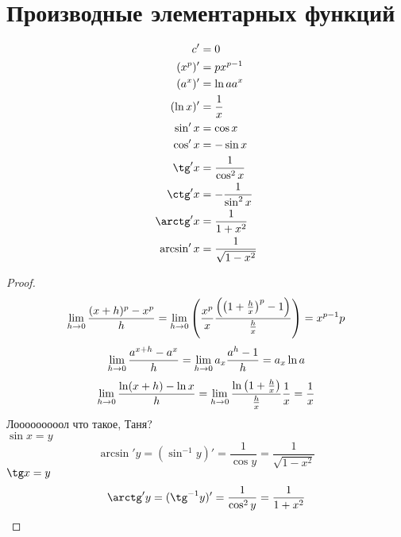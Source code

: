 \section{Производные элементарных функций}

\begin{align*}
c' &= 0 \\
(x^p)' &= px^{p-1} \\
(a^x)' &= \ln a a^x \\
(\ln x)' &= \frac1x \\
\sin' x &= \cos x \\
\cos' x &= -\sin x \\
\tg' x &= \frac1{\cos^2 x} \\
\ctg' x &= -\frac1{\sin^2 x} \\
\arctg' x &= \frac1{1+x^2} \\
\arcsin' x &= \frac1{\sqrt{1-x^2}} \\
\end{align*}
\begin{proof}
$$\lim_{h\rightarrow 0} \frac{(x+h)^p - x^p}h = \lim_{h\rightarrow 0} \left(\frac{x^p}{x} \frac{\left(\left(1+\frac{h}x\right)^p-1\right)}{\frac{h}x}\right) = x^{p-1}p$$
$$\lim_{h\rightarrow 0} \frac{a^{x+h}-a^x}h = \lim_{h\rightarrow 0} a_x \frac{a^h-1}h = a_x \ln a$$
$$\lim_{h\rightarrow 0} \frac{\ln (x+h) - \ln x}h = \lim_{h\rightarrow 0} \frac{\ln\left(1+\frac{h}x\right)}{\frac{h}x}\frac1x = \frac1x$$
Лооооооооол что такое, Таня? \\
$\sin x = y$
$$\arcsin' y = (\sin^{-1} y)' = \frac1{\cos y} = \frac1{\sqrt{1-x^2}}$$
$\tg x = y$
$$\arctg' y = (\tg^{-1} y)' = \frac1{\cos^2 y} = \frac1{1+x^2}$$
\end{proof}